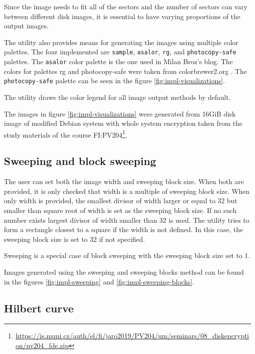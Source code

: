 \documentclass[
  digital, %
  color,   %
  oneside, %
  lof,     %
  nolot,     %
]{fithesis4}
\begin{document}
Since the image needs to fit all of the sectors and the number of sectors can vary between different disk images, it is essential to have varying proportions of the output images.

The utility also provides means for generating the images using multiple color palettes.
The four implemented are \texttt{sample}, \texttt{asalor}, \texttt{rg}, and \texttt{photocopy-safe} palettes.
The \texttt{asalor} color palette is the one used in Milan Broz's blog\cite{broz11}.
The colors for palettes rg and photocopy-safe were taken from colorbrewer2.org \cite{brewer02}.
The \texttt{photocopy-safe} palette can be seen in the figure \ref{fig:impl-visualizations}.

The utility draws the color legend for all image output methods by default.

The images in figure \ref{fig:impl-visualizations} were generated from 16GiB disk image of modified Debian system with whole system encryption taken from the study materials of the course FI:PV204\footnote{\url{https://is.muni.cz/auth/el/fi/jaro2019/PV204/um/seminars/08_diskencryption/pv204_fde.zip}}.

\subsection{Sweeping and block sweeping}
\label{ssec:sweeping-and-block-sweeping}

The user can set both the image width and sweeping block size.
When both are provided, it is only checked that width is a multiple of sweeping block size.
When only width is provided, the smallest divisor of width larger or equal to 32 but smaller than square root of width is set as the sweeping block size.
If no such number exists largest divisor of width smaller than 32 is used.
The utility tries to form a rectangle closest to a square if the width is not defined.
In this case, the sweeping block size is set to 32 if not specified.

Sweeping is a special case of block sweeping with the sweeping block size set to 1.

Images generated using the sweeping and sweeping blocks method can be found in the figures \ref{fig:impl-sweeping} and \ref{fig:impl-sweeping-blocks}.

\subsection{Hilbert curve}
\label{ssec:hilbert-curve}
\end{document}
